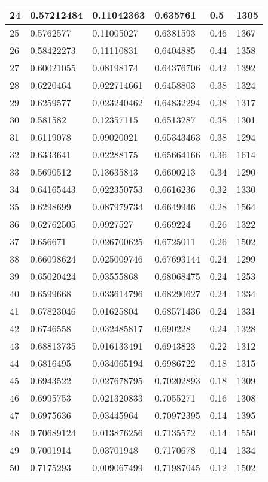\begin{longtable}{|l|l|l|l|l|l|}
24 & 0.57212484 & 0.11042363 & 0.635761 & 0.5 & 1305 \\ \hline 
25 & 0.5762577 & 0.11005027 & 0.6381593 & 0.46 & 1367 \\ \hline 
26 & 0.58422273 & 0.11110831 & 0.6404885 & 0.44 & 1358 \\ \hline 
27 & 0.60021055 & 0.08198174 & 0.64376706 & 0.42 & 1392 \\ \hline 
28 & 0.6220464 & 0.022714661 & 0.6458803 & 0.38 & 1324 \\ \hline 
29 & 0.6259577 & 0.023240462 & 0.64832294 & 0.38 & 1317 \\ \hline 
30 & 0.581582 & 0.12357115 & 0.6513287 & 0.38 & 1301 \\ \hline 
31 & 0.6119078 & 0.09020021 & 0.65343463 & 0.38 & 1294 \\ \hline 
32 & 0.6333641 & 0.02288175 & 0.65664166 & 0.36 & 1614 \\ \hline 
33 & 0.5690512 & 0.13635843 & 0.6600213 & 0.34 & 1290 \\ \hline 
34 & 0.64165443 & 0.022350753 & 0.6616236 & 0.32 & 1330 \\ \hline 
35 & 0.6298699 & 0.087979734 & 0.6649946 & 0.28 & 1564 \\ \hline 
36 & 0.62762505 & 0.0927527 & 0.669224 & 0.26 & 1322 \\ \hline 
37 & 0.656671 & 0.026700625 & 0.6725011 & 0.26 & 1502 \\ \hline 
38 & 0.66098624 & 0.025009746 & 0.67693144 & 0.24 & 1299 \\ \hline 
39 & 0.65020424 & 0.03555868 & 0.68068475 & 0.24 & 1253 \\ \hline 
40 & 0.6599668 & 0.033614796 & 0.68290627 & 0.24 & 1334 \\ \hline 
41 & 0.67823046 & 0.01625804 & 0.68571436 & 0.24 & 1331 \\ \hline 
42 & 0.6746558 & 0.032485817 & 0.690228 & 0.24 & 1328 \\ \hline 
43 & 0.68813735 & 0.016133491 & 0.6943823 & 0.22 & 1312 \\ \hline 
44 & 0.6816495 & 0.034065194 & 0.6986722 & 0.18 & 1315 \\ \hline 
45 & 0.6943522 & 0.027678795 & 0.70202893 & 0.18 & 1309 \\ \hline 
46 & 0.6995753 & 0.021320833 & 0.7055271 & 0.16 & 1308 \\ \hline 
47 & 0.6975636 & 0.03445964 & 0.70972395 & 0.14 & 1395 \\ \hline 
48 & 0.70689124 & 0.013876256 & 0.7135572 & 0.14 & 1550 \\ \hline 
49 & 0.7001914 & 0.03701948 & 0.7170678 & 0.14 & 1334 \\ \hline 
50 & 0.7175293 & 0.009067499 & 0.71987045 & 0.12 & 1502 \\ \hline 
\end{longtable}